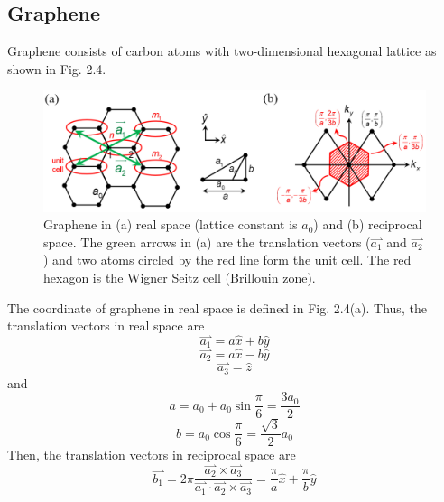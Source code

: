 \subsection{Graphene}
Graphene consists of carbon atoms with two-dimensional hexagonal lattice as shown in Fig. 2.4.
\begin{figure}[tbp]
\includegraphics[width=\textwidth]{figures/Fig2_4}
\centering
\caption{\small Graphene in (a) real space (lattice constant is $a_{0}$) and (b) reciprocal space. The green arrows in (a) are the translation vectors ($\overset{\rightharpoonup}{a_{1}}$ and $\overset{\rightharpoonup}{a_{2}}$) and two atoms circled by the red line form the unit cell. The red hexagon is the Wigner Seitz cell (Brillouin zone).}
\end{figure} The coordinate of graphene in real space is defined in Fig. 2.4(a). Thus, the translation vectors in real space are \begin{equation}
    \overset{\rightharpoonup}{a_{1}} = a\hat{x} + b\hat{y}
\end{equation} \begin{equation}
    \overset{\rightharpoonup}{a_{2}} = a\hat{x} - b\hat{y}
\end{equation} \begin{equation}
    \overset{\rightharpoonup}{a_{3}} = \hat{z}
\end{equation} and \begin{equation}
    a = a_{0} + a_{0}\sin{\frac{\pi}{6}} = \frac{3a_{0}}{2}
\end{equation} \begin{equation}
    b = a_{0}\cos{\frac{\pi}{6}} = \frac{\sqrt{3}}{2}a_{0}
\end{equation} Then, the translation vectors in reciprocal space are \begin{equation}
    \overset{\rightharpoonup}{b_{1}} = 2\pi\frac{\overset{\rightharpoonup}{a_{2}}\times\overset{\rightharpoonup}{a_{3}}}{\overset{\rightharpoonup}{a_{1}}\cdot\overset{\rightharpoonup}{a_{2}}\times\overset{\rightharpoonup}{a_{3}}} = \frac{\pi}{a}\hat{x} + \frac{\pi}{b}\hat{y}
\end{equation} \begin{equation}

\end{equation}
